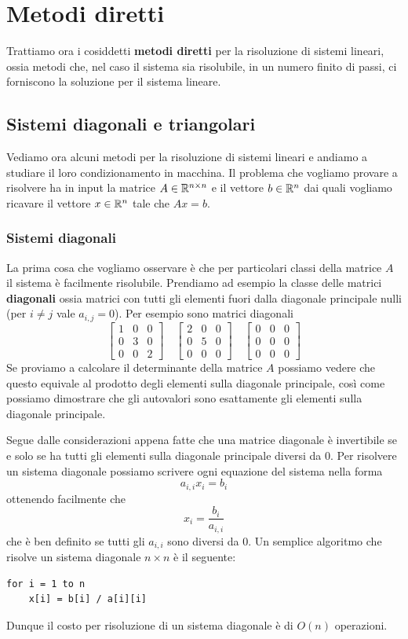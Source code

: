 \chapter{Metodi diretti}
Trattiamo ora i cosiddetti \textbf{metodi diretti} per la risoluzione di sistemi lineari, ossia metodi che,
nel caso il sistema sia risolubile, in un numero finito di passi, ci forniscono la soluzione per il sistema
lineare.

\section{Sistemi diagonali e triangolari}
Vediamo ora alcuni metodi per la risoluzione di sistemi lineari e andiamo a studiare il loro condizionamento
in macchina. Il problema che vogliamo provare a risolvere ha in input la matrice $A \in \mathbb{R}^{n \times n}$ e il
vettore $b \in \mathbb{R}^n$ dai quali vogliamo ricavare il vettore $x \in \mathbb{R}^n$ tale che $A x = b$.

\subsection{Sistemi diagonali}
La prima cosa che vogliamo osservare è che per particolari classi della matrice $A$ il sistema è facilmente
risolubile. Prendiamo ad esempio la classe delle matrici \textbf{diagonali} ossia matrici con tutti gli elementi
fuori dalla diagonale principale nulli (per $i \neq j$ vale $a_{i,j} = 0$). Per esempio sono matrici diagonali
\[
	\begin{bmatrix}
		1 & 0 & 0 \\
		0 & 3 & 0 \\
		0 & 0 & 2
	\end{bmatrix} \quad
	\begin{bmatrix}
		2 & 0 & 0 \\
		0 & 5 & 0 \\
		0 & 0 & 0
	\end{bmatrix} \quad
	\begin{bmatrix}
		0 & 0 & 0 \\
		0 & 0 & 0 \\
		0 & 0 & 0
	\end{bmatrix}
\]
Se proviamo a calcolare il determinante della matrice $A$ possiamo vedere che questo equivale al prodotto degli
elementi sulla diagonale principale, così come possiamo dimostrare che gli autovalori sono esattamente gli
elementi sulla diagonale principale.

Segue dalle considerazioni appena fatte che una matrice diagonale è invertibile se e solo se ha tutti gli elementi
sulla diagonale principale diversi da 0. Per risolvere un sistema diagonale possiamo scrivere ogni equazione del
sistema nella forma
\[ a_{i,i} x_i = b_i \]
ottenendo facilmente che
\[ x_i = \frac{b_i}{a_{i,i}} \]
che è ben definito se tutti gli $a_{i,i}$ sono diversi da 0. Un semplice algoritmo che risolve un sistema diagonale
$n \times n$ è il seguente:
\begin{lstlisting}
for i = 1 to n
	x[i] = b[i] / a[i][i]
\end{lstlisting}
Dunque il costo per risoluzione di un sistema diagonale è di $O(n)$ operazioni.


